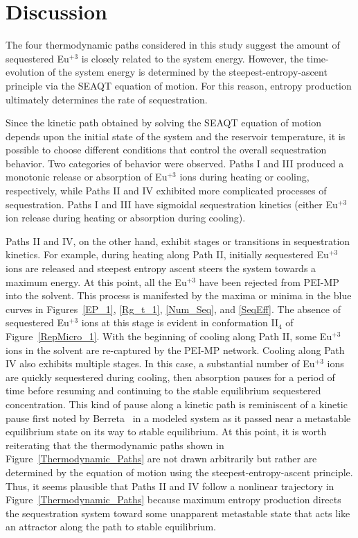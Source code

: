 \documentclass[
journal=jcisd8, %
manuscript=article,
layout=twocolumn   %
]{achemso}
\begin{document}
\section{Discussion}\label{Discussion}

The four thermodynamic paths considered in this study suggest the amount of sequestered Eu$^{+3}$ is closely related to the system energy. However, the time-evolution of the system energy is determined by the steepest-entropy-ascent principle via the SEAQT equation of motion. For this reason, entropy production ultimately determines the rate of sequestration.

Since the kinetic path obtained by solving the SEAQT equation of motion depends upon the initial state of the system and the reservoir temperature, it is possible to choose different conditions that control the overall sequestration behavior. Two categories of behavior were observed. Paths I and III produced a monotonic release or absorption of Eu$^{+3}$ ions during heating or cooling, respectively, while Paths II and IV exhibited more complicated processes of sequestration. Paths I and III have sigmoidal sequestration kinetics (either Eu$^{+3}$ ion release during heating or absorption during cooling). 

Paths II and IV, on the other hand, exhibit stages or transitions in sequestration kinetics. For example, during heating along Path II, initially sequestered Eu$^{+3}$ ions are released and steepest entropy ascent steers the system towards a maximum energy. At this point, all the Eu$^{+3}$ have been rejected from PEI-MP into the solvent. This process is manifested by the maxima or minima in the blue curves in Figures~\ref{EP_1}, \ref{Rg_t_1}, \ref{Num_Seq}, and \ref{SeqEff}. The absence of sequestered Eu$^{+3}$ ions at this stage is evident in conformation II$_4$ of Figure~\ref{RepMicro_1}. With the beginning of cooling along Path II, some Eu$^{+3}$ ions in the solvent are re-captured by the PEI-MP network.  Cooling along Path IV also exhibits multiple stages.  In this case, a substantial number of Eu$^{+3}$ ions are quickly sequestered during cooling, then absorption pauses for a period of time before resuming and continuing to the stable equilibrium sequestered concentration. This kind of pause along a kinetic path is reminiscent of a kinetic pause first noted by Berreta~\cite{Beretta2006} in a modeled system as it passed near a metastable equilibrium state on its way to stable equilibrium. At this point, it is worth reiterating that the thermodynamic paths shown in Figure~\ref{Thermodynamic_Paths} are not drawn arbitrarily but rather are determined by the equation of motion using the steepest-entropy-ascent principle. Thus, it seems plausible that Paths II and IV follow a nonlinear trajectory in Figure~\ref{Thermodynamic_Paths} because maximum entropy production directs the sequestration system toward some unapparent metastable state that acts like an attractor along the path to stable equilibrium.
\end{document}
